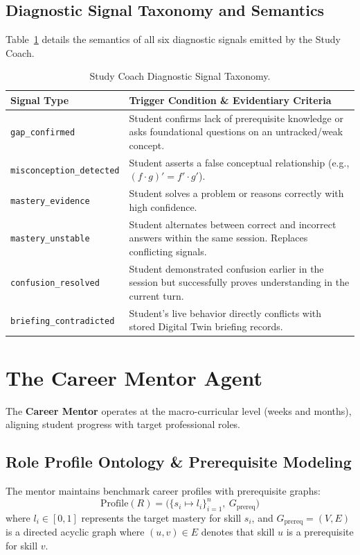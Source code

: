 \documentclass[12pt,a4paper]{article}
\begin{document}
\subsection{Diagnostic Signal Taxonomy and Semantics}
Table~\ref{tab:signals} details the semantics of all six diagnostic signals emitted by the Study Coach.

\begin{table}[htbp]
\centering
\small
\renewcommand{\arraystretch}{1.3}
\begin{tabularx}{\textwidth}{l X}
\toprule
\textbf{Signal Type} & \textbf{Trigger Condition \& Evidentiary Criteria} \\
\midrule
\texttt{gap\_confirmed} & Student confirms lack of prerequisite knowledge or asks foundational questions on an untracked/weak concept. \\
\texttt{misconception\_detected} & Student asserts a false conceptual relationship (e.g., $(f \cdot g)' = f' \cdot g'$). \\
\texttt{mastery\_evidence} & Student solves a problem or reasons correctly with high confidence. \\
\texttt{mastery\_unstable} & Student alternates between correct and incorrect answers within the same session. Replaces conflicting signals. \\
\texttt{confusion\_resolved} & Student demonstrated confusion earlier in the session but successfully proves understanding in the current turn. \\
\texttt{briefing\_contradicted} & Student's live behavior directly conflicts with stored Digital Twin briefing records. \\
\bottomrule
\end{tabularx}
\caption{Study Coach Diagnostic Signal Taxonomy.}
\label{tab:signals}
\end{table}

\section{The Career Mentor Agent}
\label{sec:mentor}

The \textbf{Career Mentor} operates at the macro-curricular level (weeks and months), aligning student progress with target professional roles.

\subsection{Role Profile Ontology \& Prerequisite Modeling}
The mentor maintains benchmark career profiles with prerequisite graphs:
\begin{equation}
    \text{Profile}(R) = \big( \{ s_i \mapsto l_i \}_{i=1}^n, \ G_{\text{prereq}} \big)
\end{equation}
where $l_i \in [0, 1]$ represents the target mastery for skill $s_i$, and $G_{\text{prereq}} = (V, E)$ is a directed acyclic graph where $(u, v) \in E$ denotes that skill $u$ is a prerequisite for skill $v$.
\end{document}
